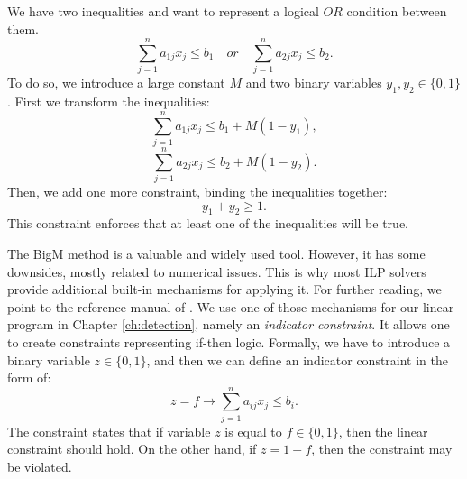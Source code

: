 \begin{example}\label{ch2:ex:ilp-bigm-or}
    We have two inequalities and want to represent a logical $OR$ condition between them.
    \[\sum_{j=1}^{n} a_{1j}x_{j} \leq b_{1} \quad or \quad \sum_{j=1}^{n} a_{2j}x_{j} \leq b_{2}.\]
    To do so, we introduce a large constant $M$ and two binary variables $y_1, y_2 \in \{0,1\}$.  First we transform the inequalities:
    \[\sum_{j=1}^{n} a_{1j}x_{j} \leq b_{1} + M(1 - y_1),\]
    \[\sum_{j=1}^{n} a_{2j}x_{j} \leq b_{2} + M(1 - y_2).\]
    Then, we add one more constraint, binding the inequalities together:
    \[y_1 + y_2 \geq 1.\]
    This constraint enforces that at least one of the inequalities will be true.
\end{example}

The BigM method is a valuable and widely used tool. 
However, it has some downsides, mostly related to numerical issues.
This is why most ILP solvers provide additional built-in mechanisms for applying it.
For further reading, we point to the reference manual of \cite{ilp-gurobi}.
We use one of those mechanisms for our linear program in Chapter \ref{ch:detection}, namely an \textit{indicator constraint}.
It allows one to create constraints representing if-then logic.
Formally, we have to introduce a binary variable $z \in \{0,1\}$, and then we can define an indicator constraint in the form of:
\[z = f \longrightarrow \sum_{j=1}^{n} a_{ij}x_{j} \leq b_{i}.\]
The constraint states that if variable $z$ is equal to $f \in \{0,1\}$, then the linear constraint should hold.
On the other hand, if $z = 1 - f$, then the constraint may be violated.